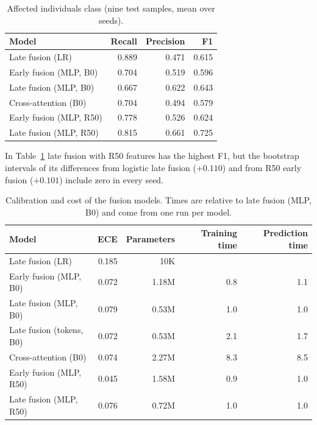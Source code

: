 \documentclass[11pt,a4paper]{article}
\begin{document}
\begin{table}[H]
  \centering
  \small
  \caption{Affected individuals class (nine test samples, mean over
  seeds).}
  \label{tab:affected}
  \begin{tabular}{lrrr}
    \toprule
    Model & Recall & Precision & F1 \\
    \midrule
    Late fusion (LR) & 0.889 & 0.471 & 0.615 \\
    Early fusion (MLP, B0) & 0.704 & 0.519 & 0.596 \\
    Late fusion (MLP, B0) & 0.667 & 0.622 & 0.643 \\
    Cross-attention (B0) & 0.704 & 0.494 & 0.579 \\
    Early fusion (MLP, R50) & 0.778 & 0.526 & 0.624 \\
    Late fusion (MLP, R50) & 0.815 & 0.661 & 0.725 \\
    \bottomrule
  \end{tabular}
\end{table}

In Table~\ref{tab:affected} late fusion with R50 features has the
highest F1, but the bootstrap intervals of its differences from logistic
late fusion ($+0.110$) and from R50 early fusion ($+0.101$) include
zero in every seed.

\begin{table}[H]
  \centering
  \small
  \caption{Calibration and cost of the fusion models. Times are relative
  to late fusion (MLP, B0) and come from one run per model.}
  \label{tab:cost}
  \begin{tabular}{lrrrr}
    \toprule
    Model & ECE & Parameters & Training time & Prediction time \\
    \midrule
    Late fusion (LR) & 0.185 & 10K & & \\
    Early fusion (MLP, B0) & 0.072 & 1.18M & 0.8 & 1.1 \\
    Late fusion (MLP, B0) & 0.079 & 0.53M & 1.0 & 1.0 \\
    Late fusion (tokens, B0) & 0.072 & 0.53M & 2.1 & 1.7 \\
    Cross-attention (B0) & 0.074 & 2.27M & 8.3 & 8.5 \\
    Early fusion (MLP, R50) & 0.045 & 1.58M & 0.9 & 1.0 \\
    Late fusion (MLP, R50) & 0.076 & 0.72M & 1.0 & 1.0 \\
    \bottomrule
  \end{tabular}
\end{table}
\end{document}
